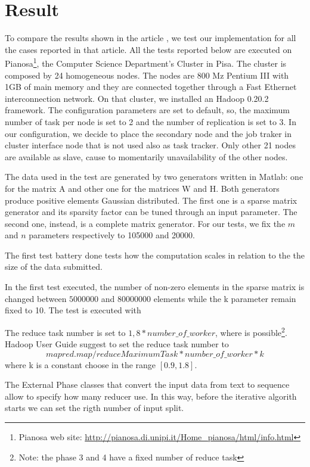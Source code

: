 \section{Result}
\label{result}

To compare the results shown in the article \cite{liu2010}, we test our implementation for all the cases reported in that article. All the tests reported below are executed on Pianosa\footnote{Pianosa web site: \url{http://pianosa.di.unipi.it/Home_pianosa/html/info.html}}, the Computer Science Department's Cluster in Pisa. The cluster is composed by 24 homogeneous nodes. The nodes are 800 Mz Pentium III with 1GB of main memory and they are connected together through a Fast Ethernet interconnection network. On that cluster, we installed an Hadoop 0.20.2 framework. The configuration parameters are set to default, so, the maximum number of task per node is set to 2 and the number of replication is set to 3. In our configuration, we decide to place the secondary node and the job traker in cluster interface node that is not used also as task tracker. Only other 21 nodes are available as slave, cause to momentarily unavailability of the other nodes.

The data used in the test are generated by two generators written in Matlab: one for the matrix A and other one for the matrices W and H. Both generators produce positive elements Gaussian distributed. The first one is a sparse matrix generator and its sparsity factor can be tuned through an input parameter. The second one, instead, is a complete matrix generator. For our tests, we fix the $m$ and $n$ parameters respectively to 105000 and 20000.

The first test battery done tests how the computation scales in relation to the the size of the data submitted. 

In the first test executed, the number of non-zero elements in the sparse matrix is changed between $5000000$ and $80000000$ elements while the k parameter remain fixed to 10. The test is executed with 


The reduce task number is set to $ 1,8 * number\_of\_worker$, where is possible\footnote{Note: the phase 3 and 4 have a fixed number of reduce task}. Hadoop User Guide suggest to set the reduce task number to $$ mapred.map/reduceMaximumTask * number\_of\_worker * k $$ where k is a constant choose in the range $[ 0.9, 1.8]$.


The External Phase classes that convert the input data from text to sequence allow to specify how many reducer use. In this way, before the iterative algorith starts we can set the rigth number of input split.

